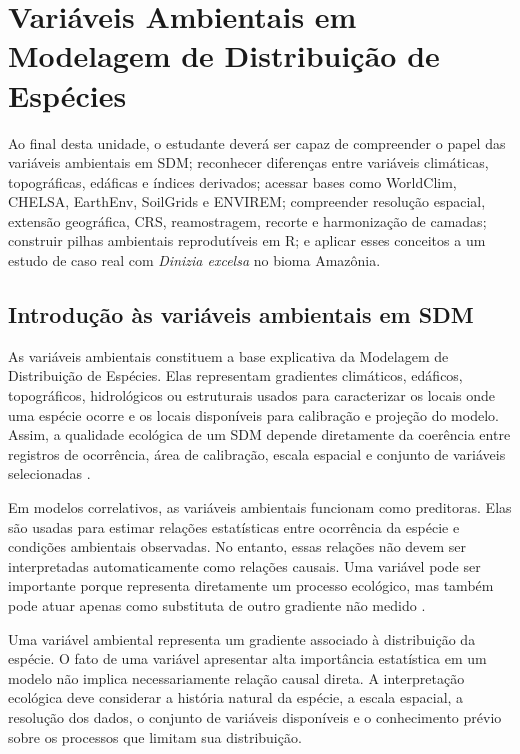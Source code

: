 \chapter[Variáveis ambientais]{Variáveis Ambientais em Modelagem de Distribuição de Espécies}

\begin{objetivos}
	Ao final desta unidade, o estudante deverá ser capaz de compreender o papel das variáveis ambientais em SDM; reconhecer diferenças entre variáveis climáticas, topográficas, edáficas e índices derivados; acessar bases como WorldClim, CHELSA, EarthEnv, SoilGrids e ENVIREM; compreender resolução espacial, extensão geográfica, CRS, reamostragem, recorte e harmonização de camadas; construir pilhas ambientais reprodutíveis em R; e aplicar esses conceitos a um estudo de caso real com \textit{Dinizia excelsa} no bioma Amazônia.
\end{objetivos}

\section{Introdução às variáveis ambientais em SDM}

As variáveis ambientais constituem a base explicativa da Modelagem de Distribuição de Espécies. Elas representam gradientes climáticos, edáficos, topográficos, hidrológicos ou estruturais usados para caracterizar os locais onde uma espécie ocorre e os locais disponíveis para calibração e projeção do modelo. Assim, a qualidade ecológica de um SDM depende diretamente da coerência entre registros de ocorrência, área de calibração, escala espacial e conjunto de variáveis selecionadas \parencite{guisan2005predicting,elith2009,guisan2017habitat}.

Em modelos correlativos, as variáveis ambientais funcionam como preditoras. Elas são usadas para estimar relações estatísticas entre ocorrência da espécie e condições ambientais observadas. No entanto, essas relações não devem ser interpretadas automaticamente como relações causais. Uma variável pode ser importante porque representa diretamente um processo ecológico, mas também pode atuar apenas como substituta de outro gradiente não medido \parencite{franklin2010,guisan2017habitat}.

\begin{conceito}[title={\faBook\quad Variável ambiental não é necessariamente mecanismo ecológico}]
	Uma variável ambiental representa um gradiente associado à distribuição da espécie. O fato de uma variável apresentar alta importância estatística em um modelo não implica necessariamente relação causal direta. A interpretação ecológica deve considerar a história natural da espécie, a escala espacial, a resolução dos dados, o conjunto de variáveis disponíveis e o conhecimento prévio sobre os processos que limitam sua distribuição.
\end{conceito}

